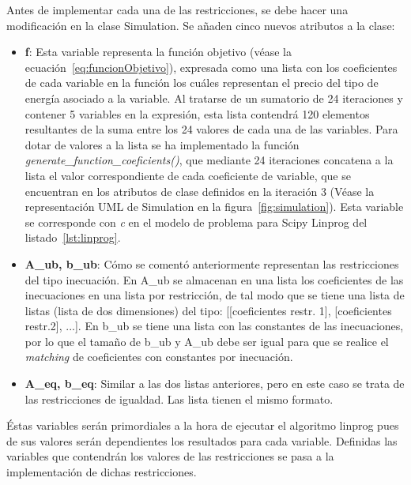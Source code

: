 Antes de implementar cada una de las restricciones, se debe hacer una modificación en la clase Simulation. Se añaden cinco nuevos atributos a la clase:
\begin{itemize}
\item \textbf{f}: Esta variable representa la función objetivo (véase la ecuación~\ref{eq:funcionObjetivo}), expresada como una lista con los coeficientes de cada variable en la función los cuáles representan el precio del tipo de energía asociado a la variable. Al tratarse de un sumatorio de 24 iteraciones y contener 5 variables en la expresión, esta lista contendrá 120 elementos resultantes de la suma entre los 24 valores de cada una de las variables. Para dotar de valores a la lista se ha implementado la función \textit{generate\_function\_coeficients()}, que mediante 24 iteraciones concatena a la lista el valor correspondiente de cada coeficiente de variable, que se encuentran en los atributos de clase definidos en la iteración 3 (Véase la representación UML de Simulation en la figura~\ref{fig:simulation}). Esta variable se corresponde con \textit{c} en el modelo de problema para Scipy Linprog del listado~\ref{lst:linprog}.
\item \textbf{A\_ub, b\_ub}: Cómo se comentó anteriormente representan las restricciones del tipo inecuación. En A\_ub se almacenan en una lista los coeficientes de las inecuaciones en una lista por restricción, de tal modo que se tiene una lista de listas (lista de dos dimensiones) del tipo: [[coeficientes restr. 1], [coeficientes restr.2], ...]. En b\_ub se tiene una lista con las constantes de las inecuaciones, por lo que el tamaño de b\_ub y A\_ub debe ser igual para que se realice el \textit{matching} de coeficientes con constantes por inecuación.
\item \textbf{A\_eq, b\_eq}: Similar a las dos listas anteriores, pero en este caso se trata de las restricciones de igualdad. Las lista tienen el mismo formato.
\end{itemize}
Éstas variables serán primordiales a la hora de ejecutar el algoritmo linprog pues de sus valores serán dependientes los resultados para cada variable. Definidas las variables que contendrán los valores de las restricciones se pasa a la implementación de dichas restricciones.
